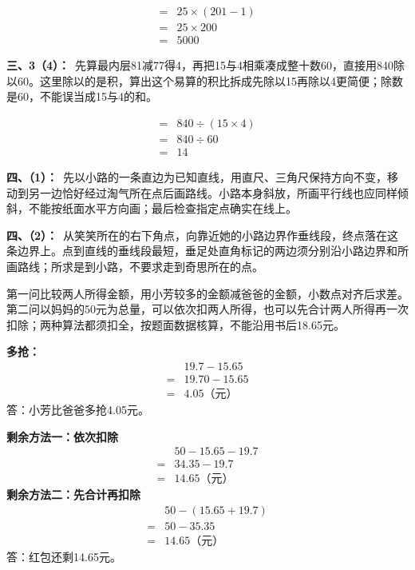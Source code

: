 \documentclass[multi=snippet,border=0pt]{standalone}
\newenvironment{snippet}[3]{\begin{minipage}{#1bp}\color{answerred}\fontsize{#2}{#3}\selectfont\raggedright}{\end{minipage}}
\begin{document}
\begin{snippet}{200.067}{10.5}{12.8}\[\begin{aligned}={}&25\times(201-1)\\={}&25\times200\\={}&5000\end{aligned}\]\end{snippet}
\begin{snippet}{505}{11.5}{14}\textbf{三、3（4）：}\ 先算最内层81减77得4，再把15与4相乘凑成整十数60，直接用840除以60。这里除以的是积，算出这个易算的积比拆成先除以15再除以4更简便；除数是60，不能误当成15与4的和。\end{snippet}
\begin{snippet}{200.567}{10.5}{12.8}\[\begin{aligned}={}&840\div(15\times4)\\={}&840\div60\\={}&14\end{aligned}\]\end{snippet}
\begin{snippet}{505}{11.5}{14}\textbf{四、（1）：}\ 先以小路的一条直边为已知直线，用直尺、三角尺保持方向不变，移动到另一边恰好经过淘气所在点后画路线。小路本身斜放，所画平行线也应同样倾斜，不能按纸面水平方向画；最后检查指定点确实在线上。\end{snippet}
\begin{snippet}{505}{11.5}{14}\textbf{四、（2）：}\ 从笑笑所在的右下角点，向靠近她的小路边界作垂线段，终点落在这条边界上。点到直线的垂线段最短，垂足处直角标记的两边须分别沿小路边界和所画路线；所求是到小路，不要求走到奇思所在的点。\end{snippet}
\begin{snippet}{505}{11.5}{14}第一问比较两人所得金额，用小芳较多的金额减爸爸的金额，小数点对齐后求差。第二问以妈妈的50元为总量，可以依次扣两人所得，也可以先合计两人所得再一次扣除；两种算法都须扣全，按题面数据核算，不能沿用书后18.65元。\par \textbf{多抢：}\[\begin{aligned} &19.7-15.65\\={}&19.70-15.65\\={}&4.05\text{（元）}\end{aligned}\]答：小芳比爸爸多抢4.05元。\par \textbf{剩余方法一：依次扣除}\[\begin{aligned} &50-15.65-19.7\\={}&34.35-19.7\\={}&14.65\text{（元）}\end{aligned}\]\textbf{剩余方法二：先合计再扣除}\[\begin{aligned} &50-(15.65+19.7)\\={}&50-35.35\\={}&14.65\text{（元）}\end{aligned}\]答：红包还剩14.65元。\end{snippet}
\end{document}
